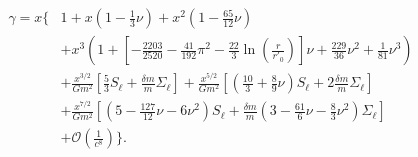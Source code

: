 \begin{align}
\gamma=x\Bigg\{ &
1
+x \left(1 -\frac{1}{3} \nu\right)
+x^2 \left(1 -\frac{65}{12} \nu\right)\nonumber\\
&+x^3 \left(
1+\left[-\frac{2203}{2520}-\frac{41}{192}\pi^2-\frac{22}{3}\ln\left(\frac{r}{r'_0}\right)\right]\nu + \frac{229}{36} \nu^2 + \frac{1}{81}\nu^3\right) \nonumber\\
&+\frac{x^{3/2}}{G m^2}\left[\frac{5}{3}S_\ell+\frac{\delta m}{m}\Sigma _\ell\right]
+\frac{x^{5/2}}{G m^2} \left[\left(\frac{10}{3} + \frac{8}{9} \nu\right)S_\ell+2\frac{\delta m}{m}\Sigma _\ell\right]\nonumber\\
&+\frac{x^{7/2}}{G m^2} \left[\left(5 -\frac{127}{12} \nu -6 \nu^2\right)S_\ell+\frac{\delta m}{m}\left(3 -\frac{61}{6} \nu -\frac{8}{3} \nu^2\right)\Sigma _\ell\right]\nonumber\\
&+\mathcal{O}\left(\frac{1}{c^8}\right)
\Bigg\}.
\end{align}